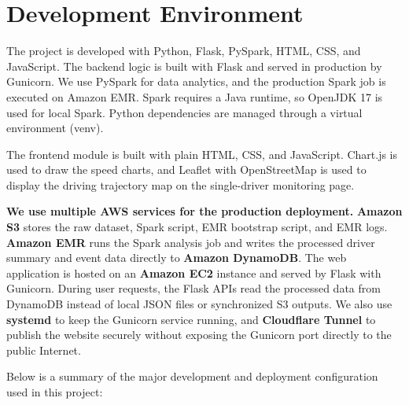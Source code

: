 \documentclass[12pt,a4paper]{article}
\begin{document}
\section{Development Environment}

The project is developed with Python, Flask, PySpark, HTML, CSS, and JavaScript. The backend logic is built with Flask and served in production by Gunicorn. We use PySpark for data analytics, and the production Spark job is executed on Amazon EMR. Spark requires a Java runtime, so OpenJDK 17 is used for local Spark. Python dependencies are managed through a virtual environment (venv).

The frontend module is built with plain HTML, CSS, and JavaScript. Chart.js is used to draw the speed charts, and Leaflet with OpenStreetMap is used to display the driving trajectory map on the single-driver monitoring page.

\textbf{We use multiple AWS services for the production deployment.} \textbf{Amazon S3} stores the raw dataset, Spark script, EMR bootstrap script, and EMR logs. \textbf{Amazon EMR} runs the Spark analysis job and writes the processed driver summary and event data directly to \textbf{Amazon DynamoDB}. The web application is hosted on an \textbf{Amazon EC2} instance and served by Flask with Gunicorn. During user requests, the Flask APIs read the processed data from DynamoDB instead of local JSON files or synchronized S3 outputs. We also use \textbf{systemd} to keep the Gunicorn service running, and \textbf{Cloudflare Tunnel} to publish the website securely without exposing the Gunicorn port directly to the public Internet.

Below is a summary of the major development and deployment configuration used in this project:
\end{document}

